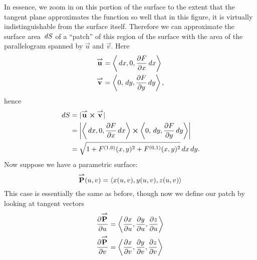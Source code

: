 \documentclass{ximera}
\begin{document}
In essence, we zoom in on this portion of the surface to the extent
that the tangent plane approximates the function so well that in this
figure, it is virtually indistinguishable from the surface itself.
Therefore we can approximate the surface area $\d S$ of a ``patch'' of
this region of the surface with the area of the parallelogram spanned
by $\vec{u}$ and $\vec{v}$. Here
\begin{align*}
  \vec{u} &= \vector{\d x,0,\pp[F]{x}\d x}\\
  \vec{v} &= \vector{0,\d y,\pp[F]{y}\d y},
\end{align*}
hence
\begin{align*}
  \d S &= |\vec u\cross \vec v|\\
  &= \left|\vector{\d x,0,\pp[F]{x}\d x}\cross\vector{0,\d y,\pp[F]{y}\d y}\right|\\
  &=\sqrt{1+F^{(1,0)}(x,y)^2+F^{(0,1)}(x,y)^2}\d x\d y.
\end{align*}
Now suppose we have a parametric surface:
\[
\vec{P}(u,v) = \vector{x(u,v), y(u,v), z(u,v)}
\]
This case is essentially the same as before, though now we define our
patch by looking at tangent vectors
\begin{align*}
  \pp[\vec{P}]{u} &= \vector{\pp[x]{u},\pp[y]{u},\pp[z]{u}}\\ 
  \pp[\vec{P}]{v} &=\vector{\pp[x]{v},\pp[y]{v},\pp[z]{v}}
\end{align*}
\end{document}
